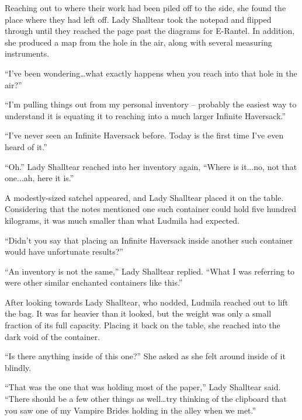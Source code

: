 Reaching out to where their work had been piled off to the side, she found the place where they had left off. Lady Shalltear took the notepad and flipped through until they reached the page past the diagrams for E-Rantel. In addition, she produced a map from the hole in the air, along with several measuring instruments.

 

“I’ve been wondering…what exactly happens when you reach into that hole in the air?”

 

“I’m pulling things out from my personal inventory – probably the easiest way to understand it is equating it to reaching into a much larger Infinite Haversack.”

 

“I’ve never seen an Infinite Haversack before. Today is the first time I’ve even heard of it.”

 

“Oh.” Lady Shalltear reached into her inventory again, “Where is it...no, not that one...ah, here it is.”

 

A modestly-sized satchel appeared, and Lady Shalltear placed it on the table. Considering that the notes mentioned one such container could hold five hundred kilograms, it was much smaller than what Ludmila had expected.

 

“Didn’t you say that placing an Infinite Haversack inside another such container would have unfortunate results?”

 

“An inventory is not the same,” Lady Shalltear replied. “What I was referring to were other similar enchanted containers like this.”

 

After looking towards Lady Shalltear, who nodded, Ludmila reached out to lift the bag. It was far heavier than it looked, but the weight was only a small fraction of its full capacity. Placing it back on the table, she reached into the dark void of the container.

 

“Is there anything inside of this one?” She asked as she felt around inside of it blindly.

 

“That was the one that was holding most of the paper,” Lady Shalltear said. “There should be a few other things as well…try thinking of the clipboard that you saw one of my Vampire Brides holding in the alley when we met.”

